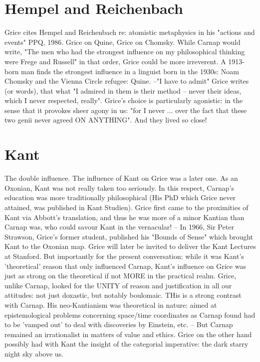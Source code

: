 \documentclass[10pt,titlepage]{book}
\begin{document}
\section{Hempel and Reichenbach}

Grice cites Hempel and Reichenbach re: 
atomistic  metaphysics in his "actions and events" PPQ, 1986.  
Grice  on Quine, Grice on Chomsky. While  Carnap would write, "The men who 
had the strongest  influence on my  philosophical thinking were Frege and 
Russell" in that order,  Grice could  be more irreverent. A 1913-born man 
finds the strongest influence in  a  linguist born in the 1930s: Noam Chomsky 
and the Vienna Circle refugee:  Quine.  --"I have to admit" Grice writes (or 
words), that what "I admired  in them is  their method -- never their ideas, 
which I never respected,  really". Grice's choice is particularly agonistic: 
in the sense that it provokes  sheer agony in  us: "for I never ... over 
the fact that these two genii  never agreed ON  ANYTHING". And they lived so 
close!

\section{Kant}

The  double influence.
The influence of Kant on Grice was a 
later one. As an Oxonian,  Kant was not really taken too seriously. In this 
respect, Carnap's education was  more traditionally philosophical (His PhD 
which Grice never attained, was  published in Kant Studien). Grice first came 
to the proximities of Kant via  Abbott's translation, and thus he was more 
of a minor Kantian than Carnap was,  who could savour Kant in the 
vernacular! -- In 1966, Sir Peter Strawson, Grice's  former student, published his 
"Bounds of Sense" which brought Kant to the  Oxonian map. Grice will later be 
invited to deliver the Kant Lectures at  Stanford. But  importantly for the 
present conversation: while it was Kant's 'theoretical'  reason that only 
influenced Carnap, Kant's influence on Grice was just as strong  on the 
theoretical if not MORE in the practical realm. Grice, unlike  Carnap, looked for 
the UNITY of reason and justification in all  our attitudes: not just 
doxastic, but notably boulomaic. THis is a strong  contrast with Carnap. His 
neo-Kantianism was theoretical in nature: aimed at  epistemological problems 
concerning space/time coordinates as Carnap  found had to be 'vamped out' to deal 
with discoveries by Einstein, etc.  -- But Carnap remained an irrationalist 
in matters of value and  ethics. Grice on the other hand possibly had with 
Kant the insight of the  categorial imperative: the dark starry night sky 
above us. 
\end{document}

